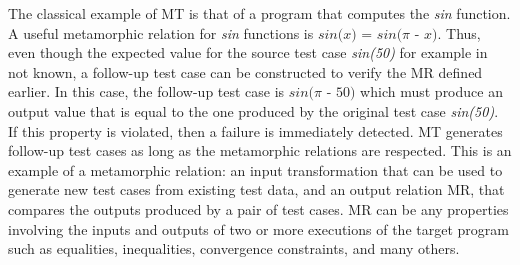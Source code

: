 
The classical example of MT is that of a program that computes the \textit{sin} function. A useful metamorphic relation for \textit{sin} functions is $\textit{sin(x) = sin($\pi$ - x)}$. Thus, even though the expected value for the source test case \textit{sin(50)} for example in not known, a follow-up test case can be constructed to verify the MR defined earlier. In this case, the follow-up test case is $\textit{sin($\pi$ - 50)}$ which must produce an output value that is equal to the one produced by the original test case \textit{sin(50)}. If this property is violated, then a failure is immediately detected.
MT generates follow-up test cases as long as the metamorphic relations are respected.
This is an example of a metamorphic relation: an input transformation that can be used to generate new test cases from existing test data, and an output relation MR, that compares the outputs produced by a pair of test cases.
MR can be any properties involving the inputs and outputs of two or more executions of the target program such as equalities, inequalities, convergence constraints, and many others.

